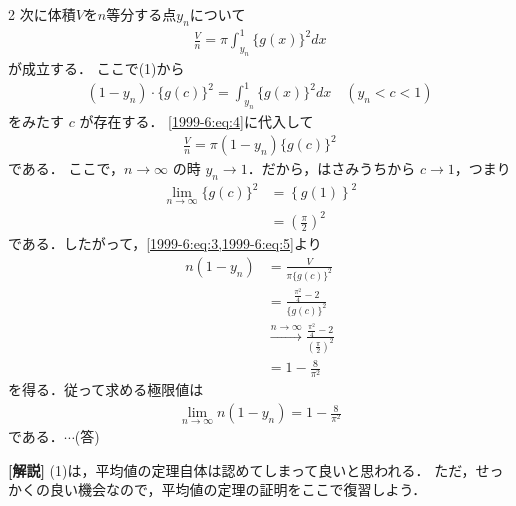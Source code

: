 \documentclass[../../../../main.tex]{subfiles}
\begin{document}
\begin{multicols}{2}
    次に体積$V$を$n$等分する点$y_n$について
    \begin{align}
        \frac{V}{n} = \pi \int_{y_n}^{1} \{g(x)\}^2 dx \label{1999-6:eq:4}
    \end{align}
    が成立する．
    ここで(1)から
    \begin{align*}
        (1-y_n) \cdot \{g(c)\}^2 = \int_{y_n}^{1} \{g(x)\}^2 dx \quad (y_n < c < 1)
    \end{align*}
    をみたす $c$ が存在する．
    \cref{1999-6:eq:4}に代入して
    \begin{align}
        \frac{V}{n} = \pi (1-y_n) \{g(c)\}^2 \label{1999-6:eq:5}
    \end{align}
    である．
    ここで，$n \to \infty$ の時 $y_n \to 1$．だから，はさみうちから $c \to 1$，つまり
    \begin{align*}
        \lim_{n\to\infty} \{g(c)\}^2
         & = \left\{g(1) \right\}^2       \\
         & = \left(\frac{\pi}{2}\right)^2
    \end{align*}
    である．したがって，\cref{1999-6:eq:3,1999-6:eq:5}より
    \begin{align*}
        n(1-y_n)
         & = \frac{V}{\pi\{g(c)\}^2}                                                         \\
         & = \frac{\frac{\pi^2}{4} - 2}{\{g(c)\}^2}                                          \\
         & \xrightarrow{n\to\infty} \frac{\frac{\pi^2}{4} - 2}{\left(\frac{\pi}{2}\right)^2} \\
         & = 1 -  \frac{8}{\pi^2}
    \end{align*}
    を得る．従って求める極限値は
    \begin{align*}
        \lim_{n\to\infty} n(1-y_n) = 1 -  \frac{8}{\pi^2}
    \end{align*}
    である．$\cdots$(答)

    \vspace{10pt}
    {\bf[解説]}
    (1)は，平均値の定理自体は認めてしまって良いと思われる．
    ただ，せっかくの良い機会なので，平均値の定理の証明をここで復習しよう．

    \newpage
\end{multicols}
\end{document}
